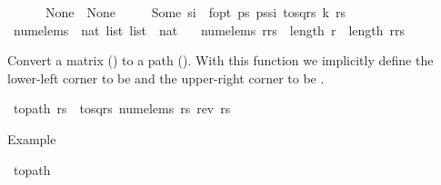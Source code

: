 \begin{isabellebody}
\ \ \ \ \ \ None\ {\isasymRightarrow}\ None\isanewline
\ \ \ \ {\isacharbar}{\kern0pt}\ Some\ s\isactrlsub i\ {\isasymRightarrow}\ f{\isacharunderscore}{\kern0pt}opt\ {\isacharparenleft}{\kern0pt}{\isasymlambda}ps{\isachardot}{\kern0pt}\ ps{\isacharat}{\kern0pt}{\isacharbrackleft}{\kern0pt}s\isactrlsub i{\isacharbrackright}{\kern0pt}{\isacharparenright}{\kern0pt}\ {\isacharparenleft}{\kern0pt}to{\isacharunderscore}{\kern0pt}sqrs\ {\isacharparenleft}{\kern0pt}k{\isacharminus}{\kern0pt}{}{\isacharparenright}{\kern0pt}\ rs{\isacharparenright}{\kern0pt}{\isacharparenright}{\kern0pt}{\isachardoublequoteclose}\isanewline
\isanewline
{}\isamarkupfalse%
\ num{\isacharunderscore}{\kern0pt}elems\ {\isacharcolon}{\kern0pt}{\isacharcolon}{\kern0pt}\ {\isachardoublequoteopen}{\isacharparenleft}{\kern0pt}nat\ list{\isacharparenright}{\kern0pt}\ list\ {\isasymRightarrow}\ nat{\isachardoublequoteclose}\ \isanewline
\ \ {\isachardoublequoteopen}num{\isacharunderscore}{\kern0pt}elems\ {\isacharparenleft}{\kern0pt}r{\isacharhash}{\kern0pt}rs{\isacharparenright}{\kern0pt}\ {\isacharequal}{\kern0pt}\ length\ r\ {\isacharasterisk}{\kern0pt}\ length\ {\isacharparenleft}{\kern0pt}r{\isacharhash}{\kern0pt}rs{\isacharparenright}{\kern0pt}{\isachardoublequoteclose}%
\begin{isamarkuptext}%
Convert a matrix () to a path (). With this function we implicitly 
define the lower-left corner to be  and the upper-right corner to be .%
\end{isamarkuptext}\isamarkuptrue%
\isamarkupfalse%
\ {\isachardoublequoteopen}to{\isacharunderscore}{\kern0pt}path\ rs\ {\isasymequiv}\ to{\isacharunderscore}{\kern0pt}sqrs\ {\isacharparenleft}{\kern0pt}num{\isacharunderscore}{\kern0pt}elems\ rs{\isacharparenright}{\kern0pt}\ {\isacharparenleft}{\kern0pt}rev\ rs{\isacharparenright}{\kern0pt}{\isachardoublequoteclose}%
\begin{isamarkuptext}%
Example%
\end{isamarkuptext}\isamarkuptrue%
\isamarkupfalse%
\ {\isachardoublequoteopen}to{\isacharunderscore}{\kern0pt}path\ \isanewline
\ \ {\isacharbrackleft}{\kern0pt}{\isacharbrackleft}{\kern0pt}{}{\isacharcomma}{\kern0pt}{}{}{\isacharcomma}{\kern0pt}{}{}{\isacharcomma}{\kern0pt}{}{}{\isacharcomma}{\kern0pt}{}{\isacharbrackright}{\kern0pt}{\isacharcomma}{\kern0pt}\isanewline

\end{isabellebody}
